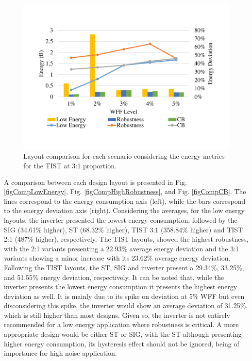 \documentclass[pgmicro,mestrado,english]{iiufrgs}
\begin{document}
    \begin{figure}[]
        \centering
            \includegraphics[width=1\textwidth, trim={1.25cm 3cm 2cm 3cm}, clip]{comp3Ltist312Energy.pdf}
            \caption{Layout comparison for each scenario considering the energy metrics for the TIST at 3:1 proportion.}
        \label{figscCompTIST31}
    \end{figure}

    A comparison between each design layout is presented in Fig. \ref{figCompLowEnergy}, Fig. \ref{figCompHighRobustness}, and Fig. \ref{figCompCB}. The lines correspond to the energy consumption axis (left), while the bars correspond to the energy deviation axis (right). Considering the averages, for the low energy layouts, the inverter presented the lowest energy consumption, followed by the SIG (34.61\% higher), ST (68.32\% higher), TIST 3:1 (358.84\% higher) and TIST 2:1 (487\% higher), respectively. The TIST layouts, showed the highest robustness, with the 2:1 variants presenting a 22.93\% average energy deviation and the 3:1 variants showing a minor increase with its 23.62\% average energy deviation. Following the TIST layouts, the ST, SIG and inverter present a 29.34\%, 33.25\%, and 51.55\% energy deviation, respectively. It can be noted that, while the inverter presents the lowest energy consumption it presents the highest energy deviation as well. It is mainly due to its spike on deviation at 5\% WFF but even disconsidering this spike, the inverter would show an average deviation of 31.25\%, which is still higher than most designs. Given so, the inverter is not entirely recommended for a low energy application where robustness is critical. A more appropriate design would be either ST or SIG, with the ST although presenting higher energy consumption, its hysteresis effect should not be ignored, being of importance for high noise application.
\end{document}
